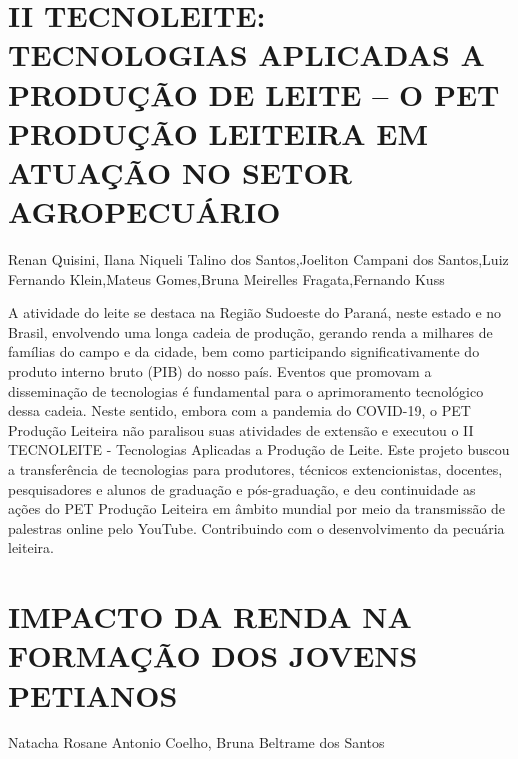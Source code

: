 

\section{II TECNOLEITE: TECNOLOGIAS APLICADAS A PRODUÇÃO DE LEITE – O PET PRODUÇÃO LEITEIRA EM ATUAÇÃO NO SETOR AGROPECUÁRIO}

Renan Quisini, Ilana Niqueli Talino dos Santos,Joeliton Campani dos Santos,Luiz Fernando Klein,Mateus Gomes,Bruna Meirelles Fragata,Fernando Kuss

A atividade do leite se destaca na Região Sudoeste do Paraná, neste estado e no Brasil, envolvendo uma longa cadeia de produção, gerando renda a milhares de famílias do campo e da cidade, bem como participando significativamente do produto interno bruto (PIB) do nosso país. Eventos que promovam a disseminação de tecnologias é fundamental para o aprimoramento tecnológico dessa cadeia. Neste sentido, embora com a pandemia do COVID-19, o PET Produção Leiteira não paralisou suas atividades de extensão e executou o II TECNOLEITE - Tecnologias Aplicadas a Produção de Leite. Este projeto buscou a transferência de tecnologias para produtores, técnicos extencionistas, docentes, pesquisadores e alunos de graduação e pós-graduação, e deu continuidade as ações do PET Produção Leiteira em âmbito mundial por meio da transmissão de palestras online pelo YouTube. Contribuindo com o desenvolvimento da pecuária leiteira.



\section{IMPACTO DA RENDA NA FORMAÇÃO DOS JOVENS PETIANOS}

Natacha Rosane Antonio Coelho, Bruna Beltrame dos Santos

